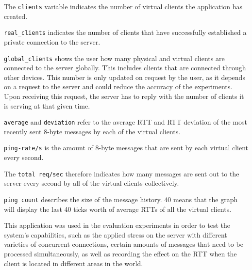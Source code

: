 \documentclass[bsc, 12pt, twoside, singlespacing, parskip, abbrevs, notimes, normalheadings, logo, deptreport]{styles/infthesis}
\begin{document}
The \texttt{clients} variable indicates the number of virtual clients the application has created. 

\texttt{real\_clients} indicates the number of clients that have successfully established a private connection to the server.

\texttt{global\_clients} shows the user how many physical and virtual clients are connected to the server globally. This includes clients that are connected through other devices. This number is only updated on request by the user, as it depends on a request to the server and could reduce the accuracy of the experiments. Upon receiving this request, the server has to reply with the number of clients it is serving at that given time.

\texttt{average} and \texttt{deviation} refer to the average RTT and RTT deviation of the most recently sent 8-byte messages by each of the virtual clients.

\texttt{ping-rate/s} is the amount of 8-byte messages that are sent by each virtual client every second.

The \texttt{total req/sec} therefore indicates how many messages are sent out to the server every second by all of the virtual clients collectively.

\texttt{ping count} describes the size of the message history. 40 means that the graph will display the last 40 ticks worth of average RTTs of all the virtual clients.

This application was used in the evaluation experiments in order to test the system's capabilities, such as the applied stress on the server with different varieties of concurrent connections, certain amounts of messages that need to be processed simultaneously, as well as recording the effect on the RTT when the client is located in different areas in the world.
\end{document}
